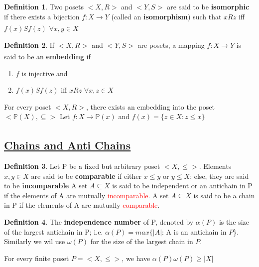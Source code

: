 \documentclass{article}
\theoremstyle{definition}
\newtheorem*{defi}{Definition}
\theoremstyle{definition}
\newenvironment{manualprop}[1]{%
  \renewcommand\themanualpropinner{#1}%
  \manualpropinner
}{\endmanualpropinner}
\theoremstyle{named}
\begin{document}
\begin{defi}
Two posets $<X, R>$ and $<Y, S>$ are said to be \textbf{isomorphic} if there exists a bijection $f: X \xrightarrow[]{} Y$ (called an \textbf{isomorphism}) such that $xRz$ iff $f(x)Sf(z)$ $\forall x, y \in X$ 
\end{defi}

\begin{defi}
If $<X, R>$ and $<Y, S>$ are posets, a mapping $f: X \xrightarrow[]{} Y$ is said to be an \textbf{embedding} if 
\begin{enumerate}
\item $f$ is injective and 
\item $f(x)Sf(z)$ iff $xRz$ $\forall x, z \in X$
\end{enumerate}
\end{defi}

\begin{manualprop}{7}
For every poset $<X, R>$, there exists an embedding into the poset $<\mathbb{P}(X), \subseteq>$
\end{manualprop}
Let $f: X \xrightarrow[]{} \mathbb{P}(x)$ and 
$ f(x) = \{z \in X: z \leq x\} $

\subsection{\underline{Chains and Anti Chains}}
\begin{defi}
Let P be a fixed but arbitrary poset $<X, \leq>$. Elements $x, y \in X$ are said to be \textbf{comparable} if either $x \leq y$ or $ y \leq X$; else, they are said to be \textbf{incomparable}
\newline
A set $A \subseteq X$ is said to be independent or an antichain in P if the elements of A are mutually \textcolor{red}{incomparable}. A set $A \subseteq X$ is said to be a chain in P if the elements of A are mutually \textcolor{red}{comparable}.
\end{defi}

\begin{defi}
The \textbf{independence number} of P, denoted by $\alpha(P)$ is the size of the largest antichain in P; \newline i.e.  $\alpha(P) = max\{|A|$: A is an antichain in $P$\}.
\newline
Similarly we wil use $\omega(P)$ for the size of the largest chain in $P$.
\end{defi}

\begin{manualprop}{8}[important]
For every finite poset $P = <X, \leq>$, we have $\alpha(P)\omega(P) \geq |X|$
\end{manualprop}
\end{document}
